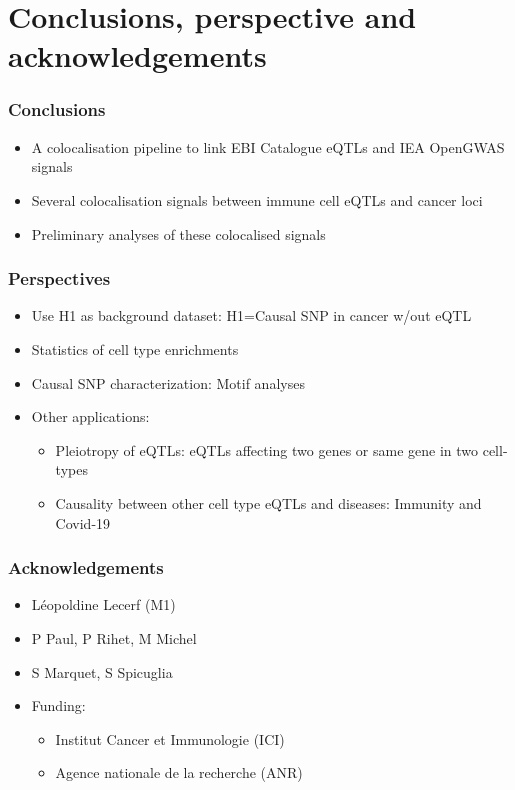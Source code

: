 \documentclass{beamer}
\begin{document}
\section{Conclusions, perspective and acknowledgements} %

\begin{frame}
\frametitle{Conclusions}

\begin{itemize}
\item A  colocalisation pipeline to link EBI Catalogue eQTLs and IEA OpenGWAS signals
\item Several colocalisation signals between immune cell eQTLs and cancer loci
\item Preliminary analyses of these colocalised signals
\end{itemize}

\end{frame}

\begin{frame}
\frametitle{Perspectives}


\begin{itemize}
\item Use H1 as background dataset: H1=Causal SNP in cancer w/out eQTL
\item Statistics of cell type enrichments
\item Causal SNP characterization: Motif analyses
\item Other applications:
\begin{itemize}
\item Pleiotropy of eQTLs: eQTLs affecting two genes or same gene in two cell-types
\item Causality between other cell type eQTLs and diseases: Immunity and Covid-19
\end{itemize}
\end{itemize}

\end{frame}

\begin{frame}
\frametitle{Acknowledgements}

\begin{itemize}
\item L\'eopoldine Lecerf (M1)
\item P Paul, P Rihet, M Michel
\item S Marquet, S Spicuglia
\item Funding:
\begin{itemize}
\item Institut Cancer et Immunologie (ICI)
\item Agence nationale de la recherche (ANR)
\end{itemize}
\end{itemize}

\end{frame}
\end{document}
